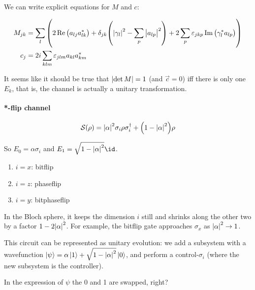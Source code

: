 \documentclass[main.tex]{subfiles}
\begin{document}
We can write explicit equations for \(M\) and \(c\):

\begin{subequations}
\begin{align}
    M_{jk} &= \sum _{l} \qty(
    2 \Re \qty(a_{lj} a_{lk}^*)
    + \delta_{jk} \qty(
    \abs{\gamma_l}^2 - \sum _p \abs{a_{lp}}^2
    )
    + 2 \sum _p \varepsilon_{jkp} \Im \qty(
    \gamma_l ^* a_{lp}
    )
    )  \\
    c_j &= 2i \sum _{klm} \varepsilon_{jlm} a_{kl} a^* _{km}
\end{align}
\end{subequations}

It seems like it should be true that \(\abs{\det M} = 1 \) (and \(\vec{c} = 0\)) iff there is only one \(E_k\), that is, the channel is actually a unitary transformation.

\paragraph{*-flip channel}

\begin{equation}
    \mathcal S ( \rho) =
    \abs{\alpha}^2 \sigma_i \rho \sigma_i ^\dag + \qty(1 - \abs{\alpha}^2 ) \rho
\end{equation}

So \(E_0 = \alpha \sigma_i\) and \(E_1 = \sqrt{1 - \abs{\alpha}^2 } \id\).

\begin{enumerate}
    \item \(i=x\): bitflip
    \item \(i=z\): phaseflip
    \item \(i=y\): bitphaseflip
\end{enumerate}

In the Bloch sphere, it keeps the dimension \(i\) still and shrinks along the other two by a factor \(1- 2\abs{\alpha}^2 \). For example, the bitflip gate approaches \(\sigma_x\) as \(\abs{\alpha}^2  \rightarrow 1\).

This circuit can be represented as unitary evolution: we add a subsystem with a wavefunction \(\ket{\psi} = \alpha \ket{1} + \sqrt{1- \abs{\alpha}^2 } \ket{0} \), and perform a control-\(\sigma_i\) (where the new subsystem is the controller).

\begin{greenbox}
  In the expression of \(\psi\) the 0 and 1 are swapped, right?
\end{greenbox}
\end{document}

